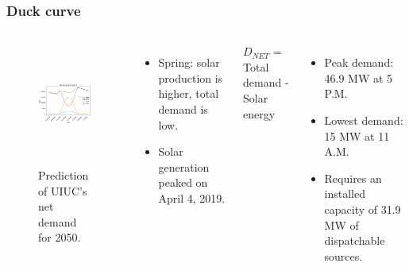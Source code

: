 \begin{frame}
\frametitle{Duck curve}
\begin{columns}
    \column[t]{5cm}
	\begin{figure}[htbp!]
		\begin{center}
			\includegraphics[height=4.0cm]{images/uiuc-duck}
		\end{center}
		\caption{Prediction of UIUC's net demand for 2050.}
	\end{figure}

    \column[t]{5.5cm}
    \begin{itemize}
 		\item Spring: solar production is higher, total demand is low.
 		\item Solar generation peaked on April 4, 2019. \vspace{0.5cm}
 	\end{itemize}

 	$D_{NET}$ = Total demand - Solar energy
	\begin{itemize}
 		\item Peak demand: 46.9 MW at 5 P.M.
 		\item Lowest demand: 15 MW at 11 A.M.
 		\item Requires an installed capacity of 31.9 MW of dispatchable sources.
 	\end{itemize}

\end{columns}
\end{frame}


